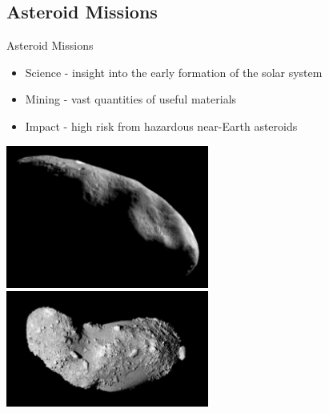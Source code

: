 \subsection*{Asteroid Missions}

\begin{frame}{Asteroid Missions}
\begin{itemize}
    \item Science - insight into the early formation of the solar system
    \item Mining - vast quantities of useful materials
    \item Impact - high risk from hazardous near-Earth asteroids
\end{itemize}    

\begin{center}
    \includegraphics[height=0.38\textheight,width=0.5\textwidth,keepaspectratio]{figures/2016AAS/near_mos_20001203_full.jpg}
    ~
    \includegraphics[height=0.38\textheight,width=0.5\textwidth,keepaspectratio]{figures/2016AAS/Itokawa8_hayabusa_1210.jpg}
\end{center}
\end{frame}

